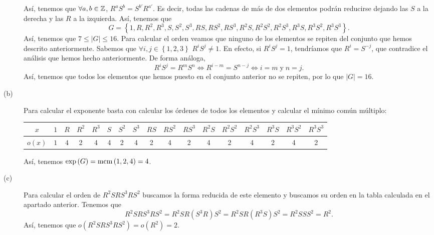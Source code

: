 \documentclass{article}
\begin{document}
\begin{sol}
\begin{description}
	Así, tenemos que $\displaystyle \forall a,b \in \mathbb{Z} $, $\displaystyle R^{a}S^{b} = S^{b'}R^{a'} $. Es decir, todas las cadenas de más de dos elementos podrán reducirse dejando las $\displaystyle S $ a la derecha y las $\displaystyle R $ a la izquierda. Así, tenemos que 
	\[G = \left\{ 1, R, R^{2}, R^{3}, S, S^{2}, S^{3}, RS, RS^{2}, RS^{3}, R^{2}S, R^{2}S^{2}, R^{2}S^{3}, R^{3}S, R^{3}S^{2}, R^{3}S^{3}\right\}  .\]
	Así, tenemos que $\displaystyle 7 \leq \left|G\right| \leq 16 $. Para calcular el orden veamos que ninguno de los elementos se repiten del conjunto que hemos descrito anteriormente. Sabemos que $\displaystyle \forall i,j \in \left\{ 1,2,3\right\}  $ $\displaystyle R^{i}S^{j} \neq 1 $. En efecto, si $\displaystyle R^{i}S^{j} = 1 $, tendríamos que $\displaystyle R^{i} = S^{-j} $, que contradice el análisis que hemos hecho anteriormente. De forma análoga, 
	\[ R^{i} S^{j} = R^{m}S^{n} \iff R^{i-m} = S^{n-j} \iff i = m \; \text{y} \; n = j.\]
	Así, tenemos que todos los elementos que hemos puesto en el conjunto anterior no se repiten, por lo que $\displaystyle \left|G\right| = 16 $. 
\item[(b)] Para calcular el exponente basta con calcular los órdenes de todos los elementos y calcular el mínimo común múltiplo: 
	\begin{center}
	\begin{tabular}{| c | c | c | c | c | c | c | c | c | c | c | c | c | c | c | c | c |}
		\hline 
		$\displaystyle x $ & $\displaystyle 1 $ & $\displaystyle R $ & $\displaystyle R^{2} $ & $\displaystyle R^{3} $ & $\displaystyle S $ & $\displaystyle S^{2} $ & $\displaystyle S^{3} $ & $\displaystyle RS $ & $\displaystyle RS^{2} $ & $\displaystyle RS^{3} $ & $\displaystyle R^{2}S $ & $\displaystyle R^{2}S^{2} $ & $\displaystyle R^{2}S^{3} $ & $\displaystyle R^{3}S $ & $\displaystyle R^{3}S^{2} $ & $\displaystyle R^{3}S^{3} $ \\
		\hline 
		$\displaystyle o\left(x\right) $ & $\displaystyle  1 $ & $\displaystyle 4 $ & 2 & 4 & 4 & 2 & 4 & 2 & 4 & 2 & 4 & 2 & 4 & 2 & 4 & 2\\
		\hline
	\end{tabular}
	\end{center}
Así, tenemos $\displaystyle \exp\left(G\right) = \text{mcm}\left(1,2,4\right) = 4 $. 
\item[(c)] Para calcular el orden de $\displaystyle R^{2}SRS^{3}RS^{2} $ buscamos la forma reducida de este elemento y buscamos su orden en la tabla calculada en el apartado anterior. Tenemos que
	\[ R^{2}SRS^{3}RS^{2} = R^{2}SR\left(S^{3}R\right)S^{2} = R^{2}SR\left(R^{3}S\right)S^{2} = R^{2}S S S^{2} = R^{2}.\]
Así, tenemos que $\displaystyle o\left(R^{2}SRS^{3}RS^{2}\right) = o\left(R^{2}\right) = 2 $. 	
\end{description}
\end{sol}
\end{document}
